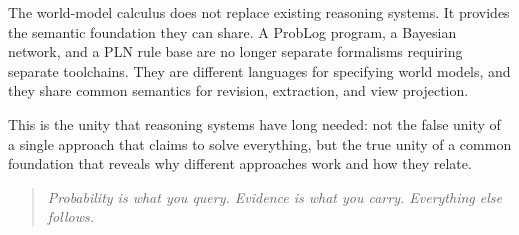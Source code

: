 The world-model calculus does not replace existing reasoning systems.
It provides the semantic foundation they can share.  A ProbLog
program, a Bayesian network, and a PLN rule base are no longer
separate formalisms requiring separate toolchains.  They are different
languages for specifying world models, and they share common semantics
for revision, extraction, and view projection.

This is the unity that reasoning systems have long needed: not the
false unity of a single approach that claims to solve everything, but
the true unity of a common foundation that reveals why different
approaches work and how they relate.

\begin{quote}
\emph{Probability is what you query.  Evidence is what you carry.
Everything else follows.}
\end{quote}
